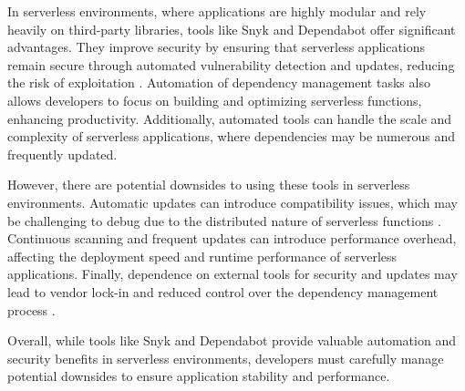\documentclass[sigconf]{acmart}
\begin{document}
In serverless environments, where applications are highly modular and rely heavily on third-party libraries, tools like Snyk and Dependabot offer significant advantages. They improve security by ensuring that serverless applications remain secure through automated vulnerability detection and updates, reducing the risk of exploitation \cite{serverlessSecurity2023}. Automation of dependency management tasks also allows developers to focus on building and optimizing serverless functions, enhancing productivity. Additionally, automated tools can handle the scale and complexity of serverless applications, where dependencies may be numerous and frequently updated.

However, there are potential downsides to using these tools in serverless environments. Automatic updates can introduce compatibility issues, which may be challenging to debug due to the distributed nature of serverless functions \cite{benischke2023updates}. Continuous scanning and frequent updates can introduce performance overhead, affecting the deployment speed and runtime performance of serverless applications. Finally, dependence on external tools for security and updates may lead to vendor lock-in and reduced control over the dependency management process \cite{kavis2014cloud}.

Overall, while tools like Snyk and Dependabot provide valuable automation and security benefits in serverless environments, developers must carefully manage potential downsides to ensure application stability and performance.



\end{document}
